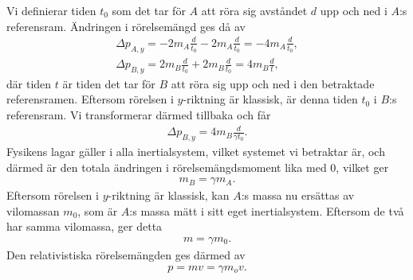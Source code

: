 Vi definierar tiden $t_{0}$ som det tar för $A$ att röra sig avståndet $d$ upp och ned i $A$:s referensram. Ändringen i rörelsemängd ges då av
\begin{align*}
	\Delta p_{A, y} = -2m_{A}\frac{d}{t_{0}} - 2m_{A}\frac{d}{t_{0}} = -4m_{A}\frac{d}{t_{0}}, \\
	\Delta p_{B, y} = 2m_{B}\frac{d}{t_{0}} + 2m_{B}\frac{d}{t_{0}} = 4m_{B}\frac{d}{t},
\end{align*}
där tiden $t$ är tiden det tar för $B$ att röra sig upp och ned i den betraktade referensramen. Eftersom rörelsen i $y$-riktning är klassisk, är denna tiden $t_{0}$ i $B$:s referensram. Vi transformerar därmed tillbaka och får
\begin{align*}
	\Delta p_{B, y} = 4m_{B}\frac{d}{\gamma t_{0}}.
\end{align*}
Fysikens lagar gäller i alla inertialsystem, vilket systemet vi betraktar är, och därmed är den totala ändringen i rörelsemängdsmoment lika med $0$, vilket ger
\begin{align*}
	m_{B} = \gamma m_{A}.
\end{align*}
Eftersom rörelsen i $y$-riktning är klassisk, kan $A$:s massa nu ersättas av vilomassan $m_{0}$, som är $A$:s massa mätt i sitt eget inertialsystem. Eftersom de två har samma vilomassa, ger detta
\begin{align*}
	m = \gamma m_{0}.
\end{align*}
Den relativistiska rörelsemängden ges därmed av
\begin{align*}
	p = mv = \gamma m_{o}v.
\end{align*}

